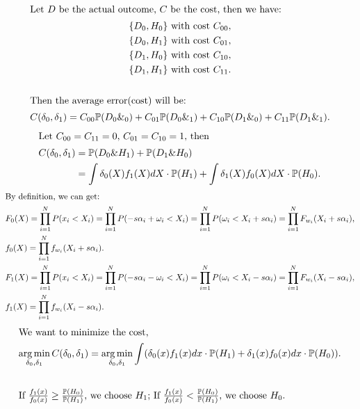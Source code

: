 \documentclass[letter, 12pt]{article}
\DeclareMathOperator*{\argmin}{arg\,min}
\begin{document}
\begin{enumerate}[wide = 0pt, label = \textbf{Problem \arabic*:}]
\begin{subquestion}
				\begin{gather*}
					 \shortintertext{Let $ D $ be the actual outcome, $ C $ be the cost, then we have:} 
					 \lbrace D_0, H_0 \rbrace \text{ with cost } C_{00}, \\
					 \lbrace D_0, H_1 \rbrace \text{ with cost } C_{01}, \\
					 \lbrace D_1, H_0 \rbrace \text{ with cost } C_{10}, \\
					 \lbrace D_1, H_1 \rbrace \text{ with cost } C_{11}. \\
					 \\
					 \shortintertext{Then the average error(cost) will be:} 
					 C(\delta_0, \delta_1) = C_{00}\mathbb{P}(D_0\&_0) + C_{01}\mathbb{P}(D_0\&_1) + C_{10}\mathbb{P}(D_1\&_0) + C_{11}\mathbb{P}(D_1\&_1). 
				\end{gather*}
				\begin{align*}
					\shortintertext{Let $ C_{00} = C_{11} = 0$, $ C_{01} = C_{10} = 1 $, then} 
					C(\delta_0, \delta_1) &=  \mathbb{P}(D_0 \& H_1) + \mathbb{P}(D_1 \& H_0) \\
					&= \int\delta_0(X)f_1(X)dX \cdot \mathbb{P}(H_1) + \int\delta_1(X)f_0(X)dX \cdot \mathbb{P}(H_0). 
				\end{align*}
				\begin{align*}
					\shortintertext{By definition, we can get:} 
					&F_0(X) = \prod_{i=1}^{N}P(x_i < X_i) = \prod_{i=1}^{N}P(-s\alpha_i + \omega_i < X_i) = \prod_{i=1}^{N}P(\omega_i< X_i +s\alpha_i) = \prod_{i=1}^{N}F_{w_i}(X_i + s\alpha_i) ,\\
					&f_0(X) = \prod_{i=1}^{N}f_{w_i}(X_i + s\alpha_i) .\\
					&F_1(X) = \prod_{i=1}^{N}P(x_i < X_i) = \prod_{i=1}^{N}P(-s\alpha_i - \omega_i < X_i) = \prod_{i=1}^{N}P(\omega_i< X_i -s\alpha_i) = \prod_{i=1}^{N}F_{w_i}(X_i - s\alpha_i) ,\\
					&f_1(X) = \prod_{i=1}^{N}f_{w_i}(X_i - s\alpha_i) .
				\end{align*}
				\begin{align*}
					\shortintertext{We want to minimize the cost, }
					\argmin_{\delta_0, \delta_1} C(\delta_0, \delta_1) &= \argmin_{\delta_0, \delta_1} \int(\delta_0(x)f_1(x)dx \cdot \mathbb{P}(H_1) + \delta_1(x)f_0(x)dx \cdot \mathbb{P}(H_0)). \\
					\\
					\shortintertext{If $ \frac{f_1(x)}{f_0(x)} \ge \frac{\mathbb{P}(H_0)}{\mathbb{P}(H_1)} $, we choose $ H_1 $; If $ \frac{f_1(x)}{f_0(x)} < \frac{\mathbb{P}(H_0)}{\mathbb{P}(H_1)} $, we choose $ H_0 $.}

\end{align*}
\end{subquestion}
\end{enumerate}
\end{document}
